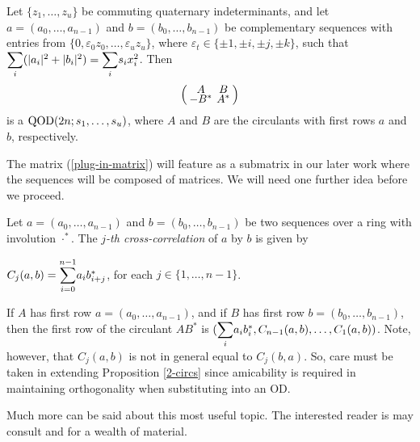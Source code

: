\documentclass[../../../main]{subfiles}
\begin{document}
 \begin{prop}\label{2-circs}
  Let $\{z_1,\dots,z_u\}$ be commuting quaternary indeterminants, and let $a=(a_0,\dots,a_{n-1})$ and $b=(b_0,\dots,b_{n-1})$ be complementary sequences with entries from $\{0,\varepsilon_0z_0, \dots, \varepsilon_uz_u\}$, where $\varepsilon_t \in \{\pm 1, \pm i, \pm j, \pm k\}$, such that $\ssum_i(|a_i|^2 + |b_i|^2)=\ssum_is_ix_i^2$. Then
  \begin{equation}\label{plug-in-matrix}
  \arraycolsep=2.0pt\def\arraystretch{0.5}
   \left(\begin{array}{cc}
    A&B\\-B^*&A^*
   \end{array}\right)
  \end{equation}
  is a $\text{QOD}(2n;s_1,\dots,s_u)$, where $A$ and $B$ are the circulants with first rows $a$ and $b$, respectively.
 \end{prop}

 The matrix (\ref{plug-in-matrix}) will feature as a submatrix in our later work where the sequences will be composed of matrices. We will need one further idea before we proceed. 

 \begin{defin}
  Let $a=(a_0,\dots,a_{n-1})$ and $b=(b_0,\dots,b_{n-1})$ be two sequences over a ring with involution $\cdot^*$. The {\it $j$-th cross-correlation} of $a$ by $b$ is given by
  \begin{defenum}
   \item $C_j(a,b)=\ssum_{i=0}^{n-1}a_ib_{i+j}^*$, for each $j \in \{1,\dots,n-1\}$.
  \end{defenum}
 \end{defin}
 
 If $A$ has first row $a=(a_0,\dots,a_{n-1})$, and if $B$ has first row $b=(b_0,\dots,b_{n-1})$, then the first row of the circulant $AB^*$ is $(\ssum_ia_ib_i^*,C_{n-1}(a,b),\dots,C_1(a,b))$. Note, however, that $C_j(a,b)$ is not in general equal to $C_j(b,a)$. So, care must be taken in extending Proposition \ref{2-circs} since amicability is required in maintaining orthogonality when substituting into an OD.
 
 Much more can be said about this most useful topic. The interested reader is may consult \cite{seberry-od-2017} and \cite{seberry-yamada-hmatrices-designs} for a wealth of material.

  \biblio
\end{document}

